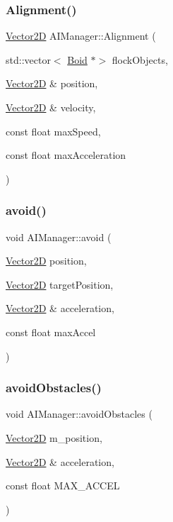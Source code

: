 \subsubsection{\texorpdfstring{Alignment()}{Alignment()}}
{\footnotesize\ttfamily \hyperlink{class_vector2_d}{Vector2D} A\+I\+Manager\+::\+Alignment (\begin{DoxyParamCaption}\item[{std\+::vector$<$ \hyperlink{class_boid}{Boid} $\ast$$>$}]{flock\+Objects,  }\item[{\hyperlink{class_vector2_d}{Vector2D} \&}]{position,  }\item[{\hyperlink{class_vector2_d}{Vector2D} \&}]{velocity,  }\item[{const float}]{max\+Speed,  }\item[{const float}]{max\+Acceleration }\end{DoxyParamCaption})\hspace{0.3cm}{\ttfamily [static]}}

\hypertarget{class_a_i_manager_ad4c0ad994de9e3d1a4780dd4050da257}{}\label{class_a_i_manager_ad4c0ad994de9e3d1a4780dd4050da257} 
\subsubsection{\texorpdfstring{avoid()}{avoid()}}
{\footnotesize\ttfamily void A\+I\+Manager\+::avoid (\begin{DoxyParamCaption}\item[{\hyperlink{class_vector2_d}{Vector2D}}]{position,  }\item[{\hyperlink{class_vector2_d}{Vector2D}}]{target\+Position,  }\item[{\hyperlink{class_vector2_d}{Vector2D} \&}]{acceleration,  }\item[{const float}]{max\+Accel }\end{DoxyParamCaption})\hspace{0.3cm}{\ttfamily [static]}}

\hypertarget{class_a_i_manager_a54dd2607612cbbfbfa4253e44645b74f}{}\label{class_a_i_manager_a54dd2607612cbbfbfa4253e44645b74f} 
\subsubsection{\texorpdfstring{avoid\+Obstacles()}{avoidObstacles()}}
{\footnotesize\ttfamily void A\+I\+Manager\+::avoid\+Obstacles (\begin{DoxyParamCaption}\item[{\hyperlink{class_vector2_d}{Vector2D}}]{m\+\_\+position,  }\item[{\hyperlink{class_vector2_d}{Vector2D} \&}]{acceleration,  }\item[{const float}]{M\+A\+X\+\_\+\+A\+C\+C\+EL }\end{DoxyParamCaption})\hspace{0.3cm}{\ttfamily [static]}}

